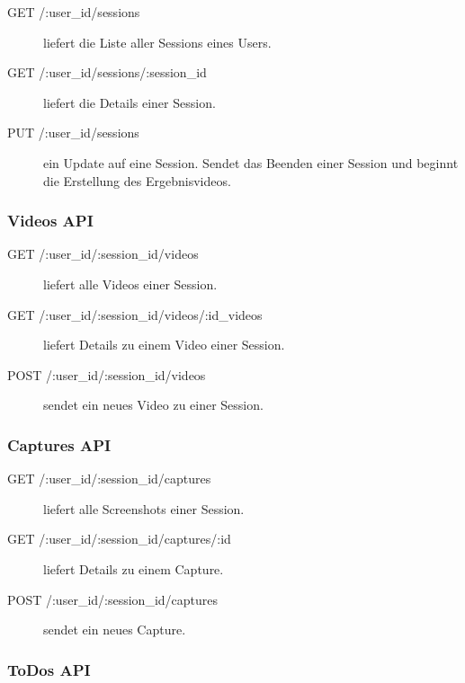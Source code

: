 \begin{description}
	\item[GET /:user\_id/sessions] liefert die Liste aller Sessions eines Users.
	
	\item[GET /:user\_id/sessions/:session\_id] liefert die Details einer Session. 
	
	\item[PUT /:user\_id/sessions] ein Update auf eine Session. Sendet das Beenden einer Session und beginnt die Erstellung des Ergebnisvideos.
\end{description}


\subsubsection{Videos API}

\begin{description}
	\item[GET /:user\_id/:session\_id/videos] liefert alle Videos einer Session.
	
	\item[GET /:user\_id/:session\_id/videos/:id\_videos] liefert Details zu einem Video einer Session.
	
	\item[POST /:user\_id/:session\_id/videos] sendet ein neues Video zu einer Session.
\end{description}


\subsubsection{Captures API}

\begin{description}
	\item[GET /:user\_id/:session\_id/captures] liefert alle Screenshots einer Session.
	
	\item[GET /:user\_id/:session\_id/captures/:id] liefert Details zu einem Capture.
	
	\item[POST /:user\_id/:session\_id/captures] sendet ein neues Capture.

\end{description}

\subsubsection{ToDos API}

